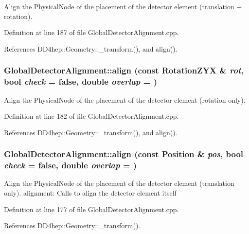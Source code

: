 Align the PhysicalNode of the placement of the detector element (translation + rotation). 

Definition at line 187 of file GlobalDetectorAlignment.cpp.

References DD4hep::Geometry::\_\-transform(), and align().\hypertarget{class_d_d4hep_1_1_alignments_1_1_global_detector_alignment_ae865aabbab6f92bff3bc6dd8c10898fc}{
\subsubsection[{align}]{ GlobalDetectorAlignment::align (const RotationZYX \& {\em rot}, \/  bool {\em check} = {\ttfamily false}, \/  double {\em overlap} = {})}}
\label{class_d_d4hep_1_1_alignments_1_1_global_detector_alignment_ae865aabbab6f92bff3bc6dd8c10898fc}


Align the PhysicalNode of the placement of the detector element (rotation only). 

Definition at line 182 of file GlobalDetectorAlignment.cpp.

References DD4hep::Geometry::\_\-transform(), and align().\hypertarget{class_d_d4hep_1_1_alignments_1_1_global_detector_alignment_a5423eff6a3f3a03fc45c6563d82ee256}{
\subsubsection[{align}]{ GlobalDetectorAlignment::align (const Position \& {\em pos}, \/  bool {\em check} = {\ttfamily false}, \/  double {\em overlap} = {})}}
\label{class_d_d4hep_1_1_alignments_1_1_global_detector_alignment_a5423eff6a3f3a03fc45c6563d82ee256}


Align the PhysicalNode of the placement of the detector element (translation only). alignment: Calls to align the detector element itself 

Definition at line 177 of file GlobalDetectorAlignment.cpp.

References DD4hep::Geometry::\_\-transform().

